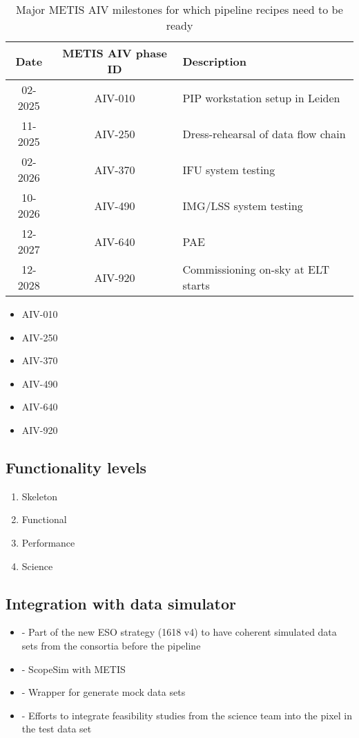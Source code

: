 \documentclass[]{spie}  %
\begin{document}
\begin{table}[]
    \centering
\caption{Major METIS AIV milestones for which pipeline recipes need to be ready}
\label{tab:dev_aiv_milestones}
    \begin{tabular}{c|c|l}
    \hline
    \hline
         Date &   METIS AIV phase ID & Description\\
         \hline
         02-2025 &   AIV-010&PIP workstation setup in Leiden\\
         11-2025 &   AIV-250&Dress-rehearsal of data flow chain\\
 02-2026 & AIV-370&IFU system testing\\
 10-2026 &  AIV-490&IMG/LSS system testing\\
 12-2027 & AIV-640&PAE\\
 12-2028 & AIV-920&Commissioning on-sky at ELT starts\\
 \hline
 \end{tabular}
      
\end{table}

\begin{itemize}
    \item AIV-010
    \item AIV-250
    \item AIV-370
    \item AIV-490
    \item AIV-640
    \item AIV-920
\end{itemize}



\subsection{Functionality levels}
\label{ssec:dev_levels}
  
 \begin{enumerate}
     \item Skeleton
     \item Functional
     \item Performance
     \item Science
 \end{enumerate}

\subsection{Integration with data simulator}
\label{ssec:dev_scopesim}

 \begin{itemize}
     \item - Part of the new ESO strategy (1618 v4) to have coherent simulated data sets from the consortia before the pipeline
     \item - ScopeSim with METIS
     \item - Wrapper for generate mock data sets
     \item - Efforts to integrate feasibility studies from the science team into the pixel in the test data set
 \end{itemize}
\end{document}
